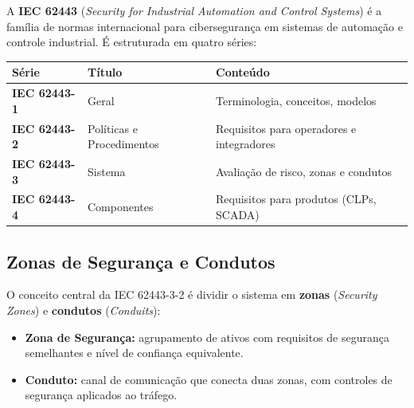 A \textbf{IEC 62443} (\emph{Security for Industrial Automation and Control Systems}) é a família de normas internacional para cibersegurança em sistemas de automação e controle industrial. É estruturada em quatro séries:

\begin{longtable}[]{@{}
  >{\raggedright\arraybackslash}p{}
  >{\raggedright\arraybackslash}p{}
  >{\raggedright\arraybackslash}p{}@{}}
\toprule\noalign{}
\begin{minipage}[b]{\linewidth}\raggedright
Série
\end{minipage} & \begin{minipage}[b]{\linewidth}\raggedright
Título
\end{minipage} & \begin{minipage}[b]{\linewidth}\raggedright
Conteúdo
\end{minipage} \\
\midrule\noalign{}
\endhead
\bottomrule\noalign{}
\endlastfoot
\textbf{IEC 62443-1} & Geral & Terminologia, conceitos, modelos \\
\textbf{IEC 62443-2} & Políticas e Procedimentos & Requisitos para operadores e integradores \\
\textbf{IEC 62443-3} & Sistema & Avaliação de risco, zonas e condutos \\
\textbf{IEC 62443-4} & Componentes & Requisitos para produtos (CLPs, SCADA) \\
\end{longtable}

\subsection{Zonas de Segurança e Condutos}\label{zonas-de-seguranuxe7a-e-condutos}

O conceito central da IEC 62443-3-2 é dividir o sistema em \textbf{zonas} (\emph{Security Zones}) e \textbf{condutos} (\emph{Conduits}):

\begin{itemize}
\tightlist
\item
  \textbf{Zona de Segurança:} agrupamento de ativos com requisitos de segurança semelhantes e nível de confiança equivalente.
\item
  \textbf{Conduto:} canal de comunicação que conecta duas zonas, com controles de segurança aplicados ao tráfego.
\end{itemize}

